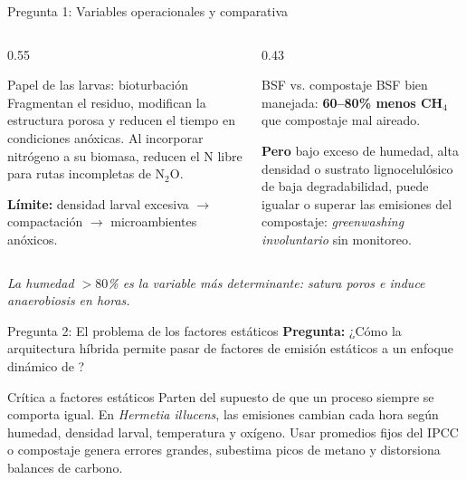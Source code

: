 \documentclass[aspectratio=169, 11pt]{beamer}
\newcommand{\BSF}{\textit{Hermetia illucens}}
\newcommand{\MRV}{\text{MRV}}
\begin{document}
\begin{frame}{Pregunta 1: Variables operacionales y comparativa}
\begin{columns}[T]
\begin{column}{0.55\textwidth}
\begin{block}{Papel de las larvas: bioturbación}
\footnotesize
Fragmentan el residuo, modifican la estructura porosa y reducen el tiempo en condiciones anóxicas. Al incorporar nitrógeno a su biomasa, reducen el N libre para rutas incompletas de N$_2$O.

\vspace{0.2cm}
\textbf{Límite:} densidad larval excesiva $\rightarrow$ compactación $\rightarrow$ microambientes anóxicos.
\end{block}
\end{column}
\begin{column}{0.43\textwidth}
\begin{exampleblock}{BSF vs. compostaje}
\footnotesize
BSF bien manejada: \textbf{60--80\% menos CH$_4$} que compostaje mal aireado.

\textbf{Pero} bajo exceso de humedad, alta densidad o sustrato lignocelulósico de baja degradabilidad, puede igualar o superar las emisiones del compostaje: \textit{greenwashing involuntario} sin monitoreo.
\end{exampleblock}
\end{column}
\end{columns}
\vspace{0.2cm}
\centering
\footnotesize\textit{La humedad $>80$\% es la variable más determinante: satura poros e induce anaerobiosis en horas.}
\end{frame}

\begin{frame}{Pregunta 2: El problema de los factores estáticos}
\textbf{Pregunta:} ¿Cómo la arquitectura híbrida permite pasar de factores de emisión estáticos a un enfoque dinámico de \MRV?

\vspace{0.3cm}
\begin{block}{Crítica a factores estáticos}
\footnotesize
Parten del supuesto de que un proceso siempre se comporta igual. En \BSF, las emisiones cambian cada hora según humedad, densidad larval, temperatura y oxígeno. Usar promedios fijos del IPCC o compostaje genera errores grandes, subestima picos de metano y distorsiona balances de carbono.
\end{block}
\end{frame}
\end{document}
